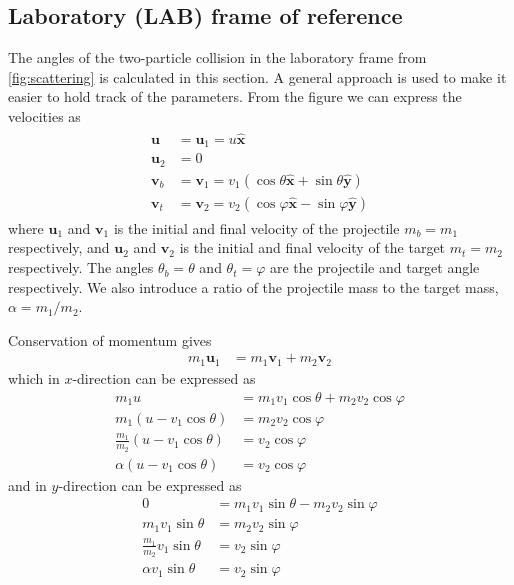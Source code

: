 \documentclass[twoside,english]{uiofysmaster/uiofysmaster}
\let\orgautoref\autoref
\renewcommand{\autoref}
        {%
		 \def\sectionautorefname{Section}%
		 \def\subsectionautorefname{Section}%
		 \def\subsubsectionautorefname{Section}%
		 \def\chapterautorefname{Chapter}%
          \orgautoref}
\begin{document}
\begin{appendices}
\section{Laboratory (LAB) frame of reference}\label{sec:LAB}
The angles of the two-particle collision in the laboratory frame from \autoref{fig:scattering} is calculated in this section. 
A general approach is used to make it easier to hold track of the parameters. 
From the figure we can express the velocities as
\begin{align}\label{eq:2p-LAB-collision}
\begin{split}
	 \boldsymbol{u} &= \boldsymbol{u}_1 = u \boldsymbol{\hat{x}}  \\
	 \boldsymbol{u}_2 &= 0  \\
	 \boldsymbol{v}_b &= \boldsymbol{v}_1 = v_1 (\cos \theta \boldsymbol{\hat{x}} + \sin \theta \boldsymbol{\hat{y}})  \\
	\boldsymbol{v}_t &= \boldsymbol{v}_2 = v_2 (\cos \varphi \boldsymbol{\hat{x}} - \sin \varphi \boldsymbol{\hat{y}})
\end{split}
\end{align}
where $\boldsymbol{u}_1$ and $\boldsymbol{v}_1$ is the initial and final velocity of the projectile $m_b = m_1$ respectively, and $\boldsymbol{u}_2$ and $\boldsymbol{v}_2$ is the initial and final velocity of the target $m_t = m_2$ respectively. The angles $\theta_b = \theta$ and $\theta_t = \varphi$ are the projectile and target angle respectively. We also introduce a ratio of the projectile mass to the target mass, $\alpha = m_1/m_2$.

Conservation of momentum gives
\begin{align*}%
	m_1 \boldsymbol{u}_1 &= m_1 \boldsymbol{v}_1 + m_2 \boldsymbol{v}_2
\end{align*}
which in $x$-direction can be expressed as
\begin{align}\label{eq:comx}
	m_1 u &= m_1 v_1 \cos \theta + m_2 v_2 \cos \varphi  \nonumber\\
	m_1 (u - v_1 \cos \theta) &= m_2 v_2 \cos \varphi  \nonumber\\
	\frac{m_1}{m_2} (u - v_1 \cos \theta) &= v_2 \cos \varphi  \nonumber\\
	\alpha (u - v_1 \cos \theta) &= v_2 \cos \varphi
\end{align}
and in $y$-direction can be expressed as
\begin{align}\label{eq:comy}
	0 &= m_1 v_1 \sin \theta - m_2 v_2 \sin \varphi \nonumber\\
	m_1 v_1 \sin \theta &= m_2 v_2 \sin \varphi \nonumber\\
	\frac{m_1}{m_2} v_1 \sin \theta &= v_2 \sin \varphi \nonumber\\
	\alpha v_1 \sin \theta &= v_2 \sin \varphi
\end{align}


\end{appendices}
\end{document}
